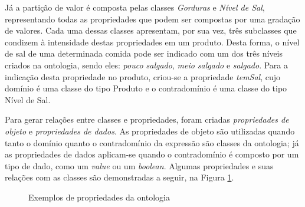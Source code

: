 Já a partição de valor é composta pelas classes \emph{Gorduras} e \emph{Nível de Sal}, representando todas as propriedades que podem ser compostas por uma gradação de valores. Cada uma dessas classes apresentam, por sua vez, três subclasses que condizem à intensidade destas propriedades em um produto. Desta forma, o nível de sal de uma determinada comida pode ser indicado com um dos três níveis criados na ontologia, sendo eles: \emph{pouco salgado}, \emph{meio salgado} e \emph{salgado}. Para a indicação desta propriedade no produto, criou-se a propriedade \emph{temSal}, cujo domínio é uma classe do tipo Produto e o contradomínio é uma classe do tipo Nível de Sal. 

Para gerar relações entre classes e propriedades, foram criadas \emph{propriedades de objeto} e \emph{propriedades de dados}. As propriedades de objeto são utilizadas quando tanto o domínio quanto o contradomínio da expressão são classes da ontologia; já as propriedades de dados aplicam-se quando o contradomínio é composto por um tipo de dado, como um \emph{value} ou um \emph{boolean}. Algumas propriedades e suas relações com as classes são demonstradas a seguir, na Figura \ref{fig:propriedades}.
\begin{figure}
	\centering
	\caption[Propriedades da Ontologia]{Exemplos de propriedades da ontologia}
	\label{fig:propriedades}
	\qquad
\end{figure}

